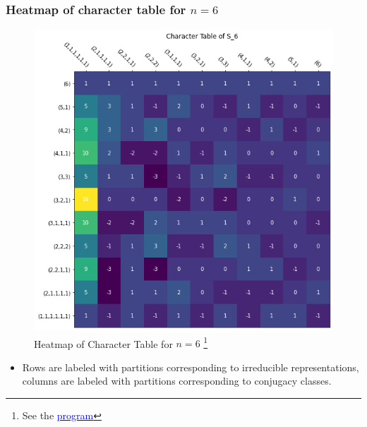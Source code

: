 \documentclass{beamer}
\begin{document}
\begin{frame}
\frametitle{Heatmap of character table for $n=6$}

\begin{figure}[H]
  \centering
  \includegraphics[width=0.4\linewidth]{char_table_6_heatmap.png}
  \caption{Heatmap of Character Table for $n=6$ 
 \footnote{ \tiny See the \href{https://github.com/TonyZhang2004/Character_Table_of_Symmetric_Groups/blob/main/char_table.ipynb}{\textcolor{blue}{program}}}}
  \label{fig:char_6}
\end{figure}

\begin{itemize}
	\item Rows are labeled with partitions corresponding to irreducible representations, columns are labeled with partitions corresponding to conjugacy classes.
\end{itemize}

\end{frame}

\end{document}
